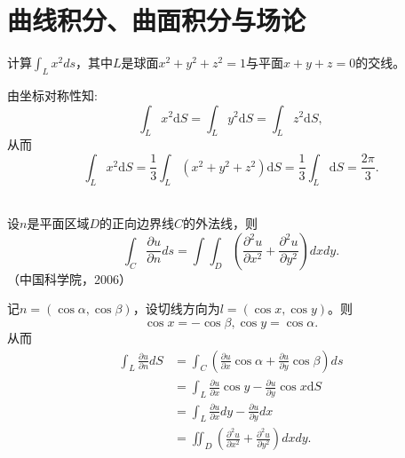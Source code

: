 \section{曲线积分、曲面积分与场论}  
  
\begin{exercise}
计算$\int_Lx^2ds$，其中$L$是球面$x^2+y^2+z^2=1$与平面$x+y+z=0$的交线。%
   
  
   由坐标对称性知:
  $$\int_Lx^2\mathrm{d}S=\int_Ly^2\mathrm{d}S=\int_Lz^2\mathrm{d}S,$$
  从而$$\int_Lx^2\mathrm{d}S=\frac{1}{3}\int_L(x^2+y^2+z^2)\mathrm{d}S=\frac{1}{3}\int_L\mathrm{d}S=\frac{2\pi}{3}.$$
 
  \end{exercise}
  \begin{exercise}
  \hfill\\
   设$n$是平面区域$D$的正向边界线$C$的外法线，则$$\int_C\frac{\partial u}{\partial n}ds=\int\int_D(\frac{\partial^2u}{\partial x^2}+\frac{\partial^2u}{\partial y^2})dxdy.$$（中国科学院，2006） 
  
记$n=(\cos\alpha,\cos\beta)$，设切线方向为$l=(\cos x,\cos y)$。则
$$\cos x=-\cos\beta,\cos y=\cos\alpha.$$
从而
\begin{align*}
\int_L\frac{\partial u}{\partial n}dS&=\int_C(\frac{\partial u}{\partial x}\cos\alpha+\frac{\partial u}{\partial y}\cos\beta)ds\\
&=\int_L\frac{\partial u}{\partial x}\cos y-\frac{\partial u}{\partial y}\cos x\mathrm{d}S\\
&=\int_L\frac{\partial u}{\partial x}dy-\frac{\partial u}{\partial y}dx\\
&=\iint_D(\frac{\partial^2u}{\partial x^2}+\frac{\partial^2u}{\partial y^2})dxdy.\\
\end{align*}  
  \end{exercise}


